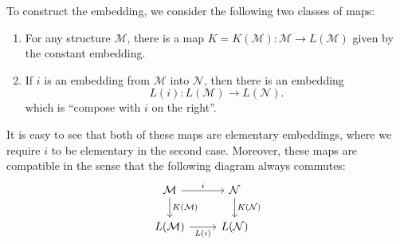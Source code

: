 \documentclass[a4paper]{article}
\newcommand\last{\mathsf{last}}
\newcommand\butlast{\mathsf{butlast}}
\begin{document}
To construct the embedding, we consider the following two classes of maps:
\begin{enumerate}
  \item For any structure $\mathcal{M}$, there is a map $K = K(\mathcal{M}): \mathcal{M} \to L(\mathcal{M})$ given by the constant embedding.
  \item If $i$ is an embedding from $\mathcal{M}$ into $\mathcal{N}$, then there is an embedding
    \[
      L(i): L(\mathcal{M}) \to L(\mathcal{N}).
    \]
    which is ``compose with $i$ on the right''.
\end{enumerate}
It is easy to see that both of these maps are elementary embeddings, where we require $i$ to be elementary in the second case. Moreover, these maps are compatible in the sense that the following diagram always commutes:
\[
  \begin{tikzcd}
    \mathcal{M} \ar[r, "i"] \ar[d, "K(\mathcal{M})"] & \mathcal{N} \ar[d, "K(\mathcal{N})"]\\
    L(\mathcal{M}) \ar[r, "L(i)"'] & L(\mathcal{N})
  \end{tikzcd}
\]
\end{document}
